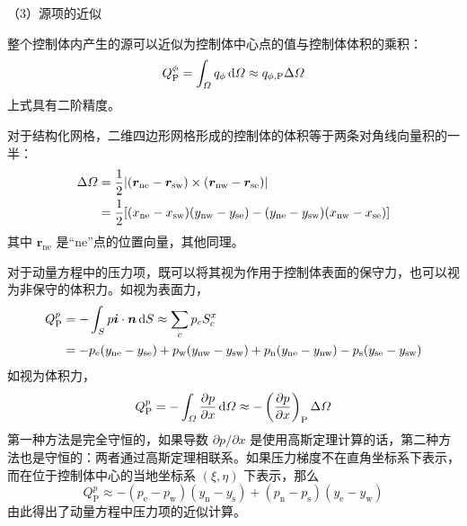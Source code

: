 （3）源项的近似

整个控制体内产生的源可以近似为控制体中心点的值与控制体体积的乘积：
\begin{equation}
	Q_{\mathrm{P}}^{\phi} = \int_{\varOmega}q_{\phi}\,\mathrm{d}\varOmega \approx
	q_{\phi,\mathrm{P}}\Delta\varOmega
\end{equation}
上式具有二阶精度。

对于结构化网格，二维四边形网格形成的控制体的体积等于两条对角线向量积的一半：
\begin{equation}
\begin{split}
	\Delta\varOmega &= \frac12\lvert(\bm{r}_{\mathrm{ne}}-\bm{r}_{\mathrm{sw}})\times (\bm{r}_{\mathrm{nw}}-\bm{r}_{\mathrm{se}})\vert \\
	&=\frac12[(x_{\mathrm{ne}}-x_{\mathrm{sw}})(y_{\mathrm{nw}}-y_{\mathrm{se}}) - (y_{\mathrm{ne}}-y_{\mathrm{sw}})(x_{\mathrm{nw}}-x_{\mathrm{se}})]
\end{split}
\end{equation}
其中 $\bm{r}_{\mathrm{ne}}$ 是“ne”点的位置向量，其他同理。

对于动量方程中的压力项，既可以将其视为作用于控制体表面的保守力，也可以视为非保守的体积力。如视为表面力，
\begin{equation}
\begin{split}
	Q_{\mathrm{P}}^p &= -\int_S p\bm{i}\cdot\bm{n}\,\mathrm{d} S \approx
	\sum_c p_cS_c^x \\
	&= -p_{\mathrm{e}}(y_{\mathrm{ne}}-y_{\mathrm{se}}) +
	p_{\mathrm{w}}(y_{\mathrm{nw}}-y_{\mathrm{sw}}) +
	p_{\mathrm{n}}(y_{\mathrm{ne}}-y_{\mathrm{nw}}) -
	p_{\mathrm{s}}(y_{\mathrm{se}}-y_{\mathrm{sw}})
\end{split}
\end{equation}
如视为体积力，
\begin{equation}
	Q_{\mathrm{P}}^p = 
	-\int_{\varOmega} \frac{\partial p}{\partial x} \,\mathrm{d}\varOmega \approx 
	-\left(\frac{\partial p}{\partial x}\right)_{\mathrm{P}} \Delta\varOmega
\end{equation}
第一种方法是完全守恒的，如果导数 $\partial p/\partial x$ 是使用高斯定理计算的话，第二种方法也是守恒的：两者通过高斯定理相联系。如果压力梯度不在直角坐标系下表示，而在位于控制体中心的当地坐标系 $(\xi,\eta)$ 下表示，那么%
\begin{equation}
	Q_{\mathrm{P}}^p \approx 
	-(p_{\mathrm{e}}-p_{\mathrm{w}})(y_{\mathrm{n}}-y_{\mathrm{s}}) + 
	(p_{\mathrm{n}}-p_{\mathrm{s}})(y_{\mathrm{e}}-y_{\mathrm{w}})
\end{equation}
由此得出了动量方程中压力项的近似计算。

